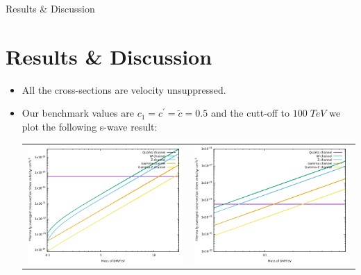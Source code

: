 \documentclass[11pt]{beamer}
\begin{document}
\begin{frame}{Results \& Discussion}
\section{Results \& Discussion}
\vspace{-4mm}

\begin{small}

\begin{itemize}

\item All the cross-sections are velocity unsuppressed.
\vspace{-1mm}
\item Our benchmark values are $c_1=c^\prime = \tilde{c}=0.5$ and the cutt-off to $100 \; TeV$ we plot the following s-wave result:


\begin{tabular}{cc}
\includegraphics[scale=0.28]{CR1.png} & \includegraphics[scale=0.28]{CR2.png} \\


\end{tabular}
\end{itemize}
\end{small}
\end{frame}
\end{document}
